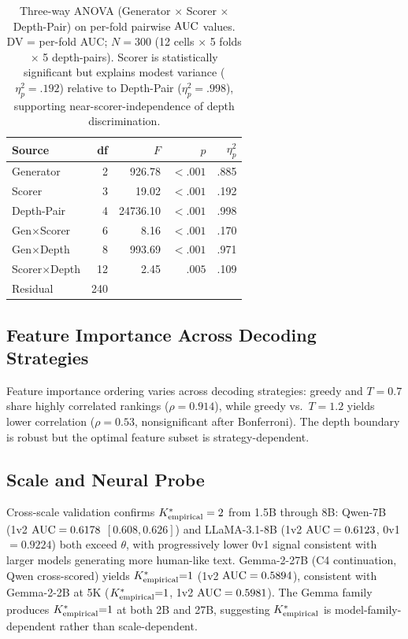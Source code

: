 \begin{table}[h]
\centering
\small
\caption{Three-way ANOVA (Generator $\times$ Scorer $\times$ Depth-Pair) on per-fold pairwise $\text{AUC}$ values. DV = per-fold AUC; $N{=}300$ (12 cells $\times$ 5 folds $\times$ 5 depth-pairs). Scorer is statistically significant but explains modest variance ($\eta^2_p{=}.192$) relative to Depth-Pair ($\eta^2_p{=}.998$), supporting near-scorer-independence of depth discrimination.}
\label{tab:anova_crossscorer}
\begin{tabular}{lrrrr}
\toprule
\textbf{Source} & \textbf{df} & $F$ & $p$ & $\eta^2_p$ \\
\midrule
Generator     & 2  & 926.78  & ${<}.001$  & .885 \\
Scorer        & 3  & 19.02  & ${<}.001$  & .192 \\
Depth-Pair    & 4  & 24736.10  & ${<}.001$  & .998 \\
Gen$\times$Scorer & 6 & 8.16 & ${<}.001$ & .170 \\
Gen$\times$Depth  & 8 & 993.69 & ${<}.001$ & .971 \\
Scorer$\times$Depth & 12 & 2.45 & $.005$ & .109 \\
Residual      & 240 & & & \\
\bottomrule
\end{tabular}
\end{table}

\subsection{Feature Importance Across Decoding Strategies}

Feature importance ordering varies across decoding strategies: greedy and $T{=}0.7$ share highly correlated rankings ($\rho = 0.914$), while greedy vs.\ $T{=}1.2$ yields lower correlation ($\rho = 0.53$, nonsignificant after Bonferroni).
The depth boundary is robust but the optimal feature subset is strategy-dependent.

\subsection{Scale and Neural Probe}
\label{sec:extended_neural_probe}

Cross-scale validation confirms ${K^*_{\text{empirical}}} = 2$ from 1.5B through 8B: Qwen-7B (1v2 $\text{AUC} = 0.6178$ $[0.608, 0.626]$) and LLaMA-3.1-8B (1v2 $\text{AUC} = 0.6123$, 0v1 $= 0.9224$) both exceed $\theta$, with progressively lower 0v1 signal consistent with larger models generating more human-like text.
Gemma-2-27B (C4 continuation, Qwen cross-scored) yields ${K^*_{\text{empirical}}}{=}1$ (1v2 $\text{AUC} = 0.5894$), consistent with Gemma-2-2B at 5K (${K^*_{\text{empirical}}}{=}1$, 1v2 $\text{AUC} = 0.5981$). The Gemma family produces ${K^*_{\text{empirical}}}{=}1$ at both 2B and 27B, suggesting ${K^*_{\text{empirical}}}$ is model-family-dependent rather than scale-dependent.

